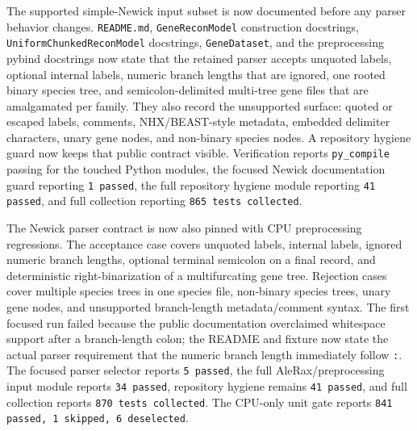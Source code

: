 \documentclass[11pt]{article}
\begin{document}
The supported simple-Newick input subset is now documented before any parser
behavior changes.  \texttt{README.md}, \texttt{GeneReconModel} construction
docstrings, \texttt{UniformChunkedReconModel} docstrings, \texttt{GeneDataset},
and the preprocessing pybind docstrings now state that the retained parser
accepts unquoted labels, optional internal labels, numeric branch lengths that
are ignored, one rooted binary species tree, and semicolon-delimited multi-tree
gene files that are amalgamated per family.  They also record the unsupported
surface: quoted or escaped labels, comments, NHX/BEAST-style metadata, embedded
delimiter characters, unary gene nodes, and non-binary species nodes.  A
repository hygiene guard now keeps that public contract visible.  Verification
reports \texttt{py\_compile} passing for the touched Python modules, the
focused Newick documentation guard reporting \texttt{1 passed}, the full
repository hygiene module reporting \texttt{41 passed}, and full collection
reporting \texttt{865 tests collected}.

The Newick parser contract is now also pinned with CPU preprocessing
regressions.  The acceptance case covers unquoted labels, internal labels,
ignored numeric branch lengths, optional terminal semicolon on a final record,
and deterministic right-binarization of a multifurcating gene tree.  Rejection
cases cover multiple species trees in one species file, non-binary species
trees, unary gene nodes, and unsupported branch-length metadata/comment syntax.
The first focused run failed because the public documentation overclaimed
whitespace support after a branch-length colon; the README and fixture now state
the actual parser requirement that the numeric branch length immediately follow
\texttt{:}.  The focused parser selector reports \texttt{5 passed}, the full
AleRax/preprocessing input module reports \texttt{34 passed}, repository
hygiene remains \texttt{41 passed}, and full collection reports
\texttt{870 tests collected}.  The CPU-only unit gate reports
\texttt{841 passed, 1 skipped, 6 deselected}.
\end{document}
